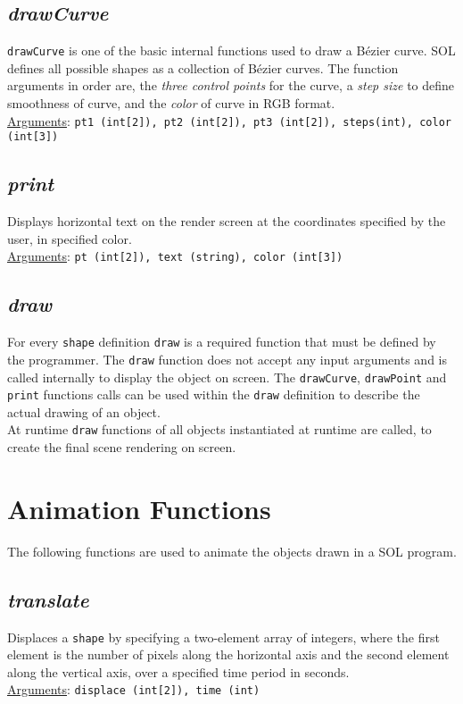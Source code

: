     \subsection{\textit{drawCurve}}
    \texttt{drawCurve} is one of the basic internal functions used to draw a B\'ezier curve. SOL defines all possible shapes as a collection of B\'ezier curves. The function arguments in order are, the \textit{three control points} for the curve, a \textit{step size} to define smoothness of curve, and the \textit{color} of curve in RGB format.\\
    \underline{Arguments}: \texttt{pt1 (int[2]), pt2 (int[2]), pt3 (int[2]), steps(int), color (int[3])}

    \subsection{\textit{print}}
    Displays horizontal text on the render screen at the coordinates specified by the user, in specified color.\\
    \underline{Arguments}: \texttt{pt (int[2]), text (string), color (int[3])}

    \subsection{\textit{draw}}
    For every \texttt{shape} definition \texttt{draw} is a required function that must be defined by the programmer. The \texttt{draw} function does not accept any input arguments and is called internally to display the object on screen. The \texttt{drawCurve}, \texttt{drawPoint} and \texttt{print} functions calls can be used within the \texttt{draw} definition to describe the actual drawing of an object.\\
    At runtime \texttt{draw} functions of all objects instantiated at runtime are called, to create the final scene rendering on screen.

\section{Animation Functions} \label{animation}
The following functions are used to animate the objects drawn in a SOL program.

    \subsection{\textit{translate}}
    Displaces a \texttt{shape} by specifying a two-element array of integers, where the first element is the number of pixels along the horizontal axis and the second element along the vertical axis, over a specified time period in seconds.\\
    \underline{Arguments}: \texttt{displace (int[2]), time (int)}

